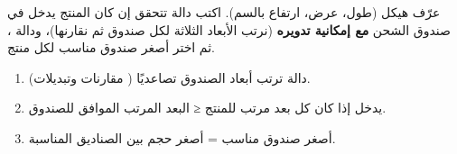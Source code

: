 \begin{statement}
عرّف هيكل  (طول، عرض، ارتفاع بالسم). اكتب دالة  تتحقق إن كان المنتج يدخل في صندوق الشحن \textbf{مع إمكانية تدويره} (نرتب الأبعاد الثلاثة لكل صندوق ثم نقارنها)، ودالة ، ثم اختر أصغر صندوق مناسب لكل منتج.
\end{statement}
\begin{stepsbox}\begin{enumerate}
\item دالة  ترتب أبعاد الصندوق تصاعديًا ( مقارنات وتبديلات).
\item يدخل إذا كان كل بعد مرتب للمنتج ≤ البعد المرتب الموافق للصندوق.
\item أصغر صندوق مناسب = أصغر حجم بين الصناديق المناسبة.
\end{enumerate}\end{stepsbox}
